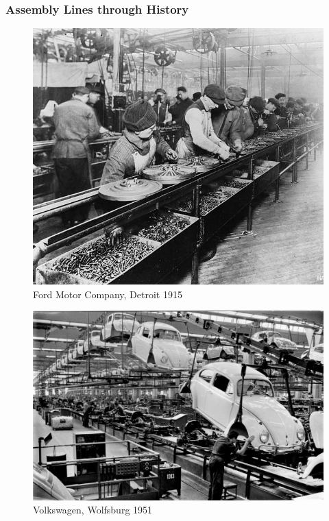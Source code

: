 \documentclass{beamer}
\begin{document}
\begin{frame}
\frametitle{Assembly Lines through History}
\begin{figure}
	\centering
	\begin{minipage}{0.45\textwidth}
		\centering
		\includegraphics[width=\linewidth]{images/history-1.jpg}\\
		Ford Motor Company, Detroit 1915
	\end{minipage}
	\hspace{5mm}
	\begin{minipage}{0.45\textwidth}
		\centering
		\includegraphics[width=\linewidth]{images/history-5.jpg}\\
		Volkswagen, Wolfsburg 1951
	\end{minipage}
\end{figure}
\end{frame}
\end{document}
